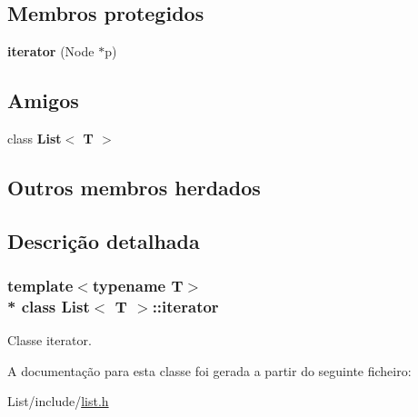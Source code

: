 \subsection*{Membros protegidos}
\begin{DoxyCompactItemize}
\item 
{\bfseries iterator} (Node $\ast$p)\hypertarget{class_list_1_1iterator_a8500b544cba7bda0c19036391ea0fa7b}{}\label{class_list_1_1iterator_a8500b544cba7bda0c19036391ea0fa7b}

\end{DoxyCompactItemize}
\subsection*{Amigos}
\begin{DoxyCompactItemize}
\item 
class {\bfseries List$<$ T $>$}\hypertarget{class_list_1_1iterator_adfa51a0eca1eba953f68ca3f65cdaa05}{}\label{class_list_1_1iterator_adfa51a0eca1eba953f68ca3f65cdaa05}

\end{DoxyCompactItemize}
\subsection*{Outros membros herdados}


\subsection{Descrição detalhada}
\subsubsection*{template$<$typename T$>$\\*
class List$<$ T $>$\+::iterator}

Classe iterator. 

A documentação para esta classe foi gerada a partir do seguinte ficheiro\+:\begin{DoxyCompactItemize}
\item 
List/include/\hyperlink{list_8h}{list.\+h}\end{DoxyCompactItemize}
